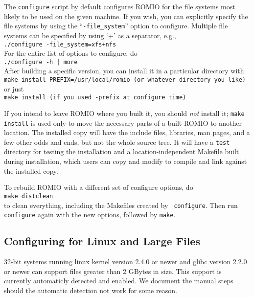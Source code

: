 The {\tt configure} script by default configures ROMIO for the file
systems most likely 
to be used on the given machine. If you wish, you can explicitly specify the file
systems by using the ``{\tt -file\_system}'' option to configure. Multiple file
systems can be specified by using `+' as a separator, e.g., \\
\hspace*{.4in} {\tt ./configure -file\_system=xfs+nfs} \\
For the entire list of options to configure, do\\ 
\hspace*{.4in} {\tt ./configure -h | more} \\
After building a specific version, you can install it in a
particular directory with \\
\hspace*{.4in} {\tt make install PREFIX=/usr/local/romio    (or whatever directory you like)} \\
or just\\
\hspace*{.4in} {\tt make install          (if you used -prefix at configure time)}

If you intend to leave ROMIO where you built it, you should {\it not}
install it; {\tt make install} is used only to move the necessary
parts of a built ROMIO to another location. The installed copy will
have the include files, libraries, man pages, and a few other odds and
ends, but not the whole source tree.  It will have a {\tt test}
directory for testing the installation and a location-independent
Makefile built during installation, which users can copy and modify to
compile and link against the installed copy.

To rebuild ROMIO with a different set of configure options, do\\
\hspace*{.4in} {\tt make distclean}\\
to clean everything, including the Makefiles created by {\tt
configure}.  Then run {\tt configure} again with the new options,
followed by {\tt make}.

\subsection{Configuring for Linux and Large Files }

32-bit systems running linux kernel version 2.4.0 or newer and glibc
version 2.2.0 or newer can support files greater than 2 GBytes in size.
This support is currently automaticly detected and enabled.  We document the
manual steps should the automatic detection not work for some reason.


